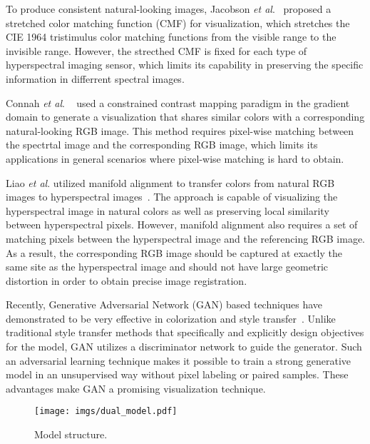 \documentclass[10pt,conference,a4paper]{IEEEtran}
\begin{document}
To produce consistent natural-looking images, Jacobson \emph{et al}.~\cite{jacobson2005design} %
proposed a stretched color matching function (CMF) for visualization, which stretches the
CIE 1964 tristimulus color matching functions from the visible range to the invisible range.
However, the strecthed CMF is fixed for each type of hyperspectral imaging sensor, which limits its capability in preserving the specific information in differrent spectral images.


Connah \emph{et al}. ~\cite{Connah2014} used a constrained contrast mapping paradigm in the gradient domain to generate a visualization that shares similar colors with a corresponding natural-looking RGB image. This method requires pixel-wise matching between the spectrtal image and the corresponding RGB image, which limits its applications in general scenarios where pixel-wise matching is hard to obtain.

Liao \emph{et al}. utilized manifold alignment to transfer colors from natural RGB images to hyperspectral images~\cite{liao2016hscolor,liao2014hscolor,liao2013hscolor}.
The approach is capable of visualizing the hyperspectral image in natural colors as well as preserving local similarity between hyperspectral pixels.
However, manifold alignment also requires a set of matching pixels between the hyperspectral image and the referencing RGB image. As a result, the corresponding RGB image should be captured at exactly the same site as the hyperspectral image and should not have large geometric distortion in order to obtain precise image registration.

Recently, Generative Adversarial Network (GAN) based techniques have demonstrated to be very effective in colorization and style transfer~\cite{cyclegan,pix2pix,dcgan}. Unlike traditional style transfer methods that specifically and explicitly design objectives for the model, GAN utilizes a discriminator network to guide the generator. Such an adversarial learning technique makes it possible to train a strong generative model in an unsupervised way without pixel labeling or paired samples. These advantages make GAN a promising visualization technique.
\begin{figure}[!t]
\centering
\texttt{[image: imgs/dual\_model.pdf]}
\caption{Model structure.}
\label{fig:model}
\end{figure}
\end{document}
